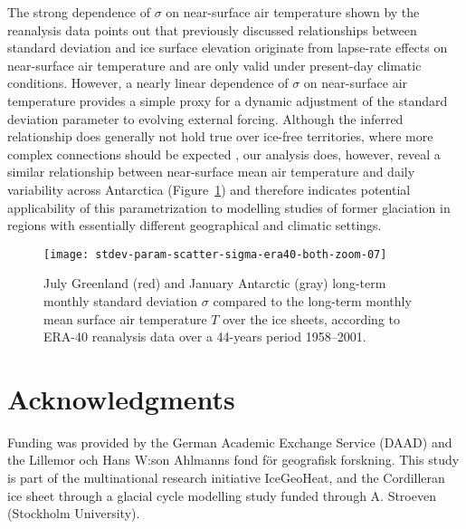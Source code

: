 \documentclass[review]{igs}
\begin{document}
The strong dependence of $\sigma$ on near-surface air temperature shown by the reanalysis data points out that previously discussed relationships between standard deviation and ice surface elevation \citep{fausto-etal-2009,fausto-etal-2011} originate from lapse-rate effects on near-surface air temperature and are only valid under present-day climatic conditions. However, a nearly linear dependence of $\sigma$ on near-surface air temperature provides a simple proxy for a dynamic adjustment of the standard deviation parameter to evolving external forcing. Although the inferred relationship does generally not hold true over ice-free territories, where more complex connections should be expected \citep{seguinot-2013}, our analysis does, however, reveal a similar relationship between near-surface mean air temperature and daily variability across Antarctica (Figure~\ref{fig:both}) and therefore indicates potential applicability of this parametrization to modelling studies of former glaciation in regions with essentially different geographical and climatic settings.

\begin{figure}
    \centering\texttt{[image: stdev-param-scatter-sigma-era40-both-zoom-07]}
    \caption{July Greenland (red) and January Antarctic (gray) long-term monthly standard deviation $\sigma$ compared to the long-term monthly mean surface air temperature $T$ over the ice sheets, according to ERA-40 reanalysis data \citep{uppala-etal-2005} over a 44-years period 1958–2001.}
    \label{fig:both}
\end{figure}


\section{Acknowledgments}

Funding was provided by the German Academic Exchange Service (DAAD) and the Lillemor och Hans W:son Ahlmanns fond för geografisk forskning. This study is part of the multinational research initiative IceGeoHeat, and the Cordilleran ice sheet through a glacial cycle modelling study funded through A. Stroeven (Stockholm University).



\end{document}
